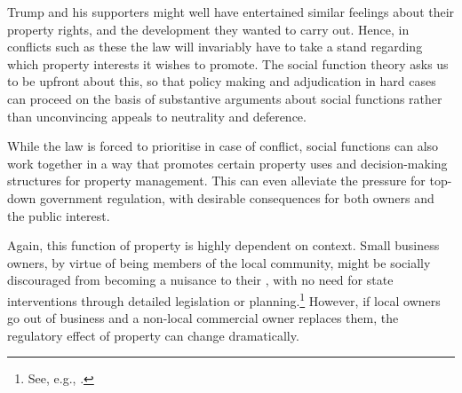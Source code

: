 Trump and his supporters might well have entertained similar feelings about their property rights, and the development they wanted to carry out. Hence, in conflicts such as these the law will invariably have to take a stand regarding which property interests it wishes to promote. The social function theory asks us to be upfront about this, so that policy making and adjudication in hard cases can proceed on the basis of substantive arguments about social functions rather than unconvincing appeals to neutrality and deference.

 
While the law is forced to prioritise in case of conflict, social functions can also work together in a way that promotes certain property uses and decision-making structures for property management. This can even alleviate the pressure for top-down government regulation, with desirable consequences for both owners and the public interest.



Again, this function of property is highly dependent on context. Small business owners, by virtue of being members of the local community, might be socially discouraged from becoming a nuisance to their , with no need for state interventions through detailed legislation or planning.\footnote{See, e.g., \cite[282-283]{ellickson91}.} However, if local owners go out of business and a non-local commercial owner replaces them, the regulatory effect of property can change dramatically. 

